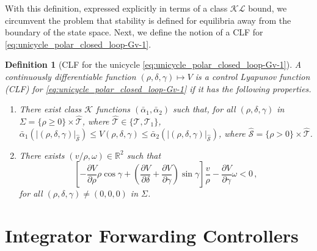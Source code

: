 \documentclass[letterpaper, 10 pt, conference]{ieeeconf}  %
\newtheorem{definition}{Definition}
\begin{document}
With this definition, expressed explicitly in terms of a class $\mathcal{KL}$ bound, we circumvent the problem that stability is defined for equilibria away from the boundary of the state space. 
Next, we define the notion of a CLF for \eqref{eq:unicycle_polar_closed_loop-Gv-1}.
\begin{definition}[CLF for the unicycle \eqref{eq:unicycle_polar_closed_loop-Gv-1}]
\label{def-CLF}
A continuously differentiable function $(\rho,\delta,\gamma)\mapsto V$ 
is a \textit{control Lyapunov function} (CLF) for \eqref{eq:unicycle_polar_closed_loop-Gv-1} if it has the following properties.
\begin{enumerate}
\item There exist class $\mathcal{K}$ functions  $(\bar\alpha_1,\bar\alpha_2)$ such that,  for all $(\rho,\delta,\gamma)$ in 
$\Sigma = \{\rho\geq 0\}\times \hat{\mathcal{T}}$, where $\hat{\mathcal{T}}\in\{\mathcal{T},\mathcal{T}_1\}$, 
$ \bar\alpha_1(|(\rho,\delta, \gamma)|_{\hat{\mathcal{S}}}) \le V(\rho,\delta,\gamma) \le \bar\alpha_2(|(\rho,\delta, \gamma)|_{\hat{\mathcal{S}}})$, where $\hat{\mathcal{S}} = \{\rho> 0\}\times \hat{\mathcal{T}}$. \label{it:clf_prop_1}
\item There exists $(v/\rho,\omega)\in \mathbb{R}^2$ such that
\begin{equation*}
\left[-\dfrac{\partial V}{\partial\rho}\rho\cos\gamma + \left(\dfrac{\partial V}{\partial\delta}+\dfrac{\partial V}{\partial\gamma}\right)\sin\gamma \right]\dfrac{v}{\rho} - \dfrac{\partial V}{\partial\gamma}\omega < 0 \,,
\end{equation*}
for all $(\rho,\delta,\gamma)\neq (0,0,0)$ in $\Sigma$. \label{it:clf_prop_2}
\end{enumerate}
\end{definition}
\raggedbottom
\section{Integrator Forwarding Controllers}
\end{document}
